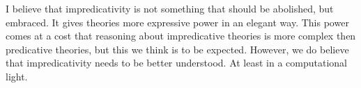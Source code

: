I believe that impredicativity is not something that should be
abolished, but embraced.  It gives theories more expressive power in
an elegant way. This power comes at a cost that reasoning about
impredicative theories is more complex then predicative theories, but
this we think is to be expected.  However, we do believe that
impredicativity needs to be better understood.  At least in a
computational light.  
